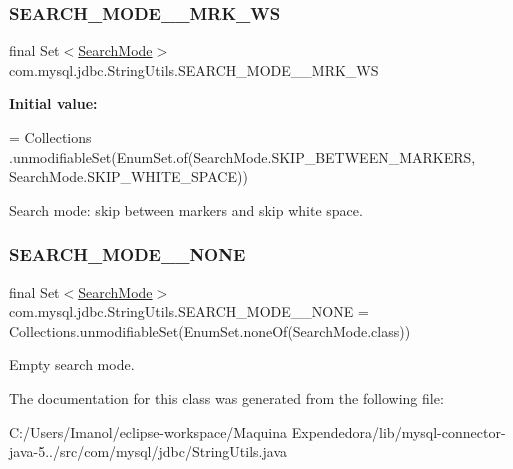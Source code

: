 \subsubsection{\texorpdfstring{S\+E\+A\+R\+C\+H\+\_\+\+M\+O\+D\+E\+\_\+\+\_\+\+M\+R\+K\+\_\+\+WS}{SEARCH\_MODE\_\_MRK\_WS}}
{\footnotesize\ttfamily final Set$<$\mbox{\hyperlink{enumcom_1_1mysql_1_1jdbc_1_1_string_utils_1_1_search_mode}{Search\+Mode}}$>$ com.\+mysql.\+jdbc.\+String\+Utils.\+S\+E\+A\+R\+C\+H\+\_\+\+M\+O\+D\+E\+\_\+\+\_\+\+M\+R\+K\+\_\+\+WS\hspace{0.3cm}{\ttfamily [static]}}

{\bfseries Initial value\+:}
\begin{DoxyCode}
= Collections
            .unmodifiableSet(EnumSet.of(SearchMode.SKIP\_BETWEEN\_MARKERS, SearchMode.SKIP\_WHITE\_SPACE))
\end{DoxyCode}
Search mode\+: skip between markers and skip white space. \mbox{\label{classcom_1_1mysql_1_1jdbc_1_1_string_utils_a358b0534d95ad61de34282abee33205a}} 
\subsubsection{\texorpdfstring{S\+E\+A\+R\+C\+H\+\_\+\+M\+O\+D\+E\+\_\+\+\_\+\+N\+O\+NE}{SEARCH\_MODE\_\_NONE}}
{\footnotesize\ttfamily final Set$<$\mbox{\hyperlink{enumcom_1_1mysql_1_1jdbc_1_1_string_utils_1_1_search_mode}{Search\+Mode}}$>$ com.\+mysql.\+jdbc.\+String\+Utils.\+S\+E\+A\+R\+C\+H\+\_\+\+M\+O\+D\+E\+\_\+\+\_\+\+N\+O\+NE = Collections.\+unmodifiable\+Set(Enum\+Set.\+none\+Of(Search\+Mode.\+class))\hspace{0.3cm}{\ttfamily [static]}}

Empty search mode. 

The documentation for this class was generated from the following file\+:\begin{DoxyCompactItemize}
\item 
C\+:/\+Users/\+Imanol/eclipse-\/workspace/\+Maquina Expendedora/lib/mysql-\/connector-\/java-\/5../src/com/mysql/jdbc/String\+Utils.\+java\end{DoxyCompactItemize}
